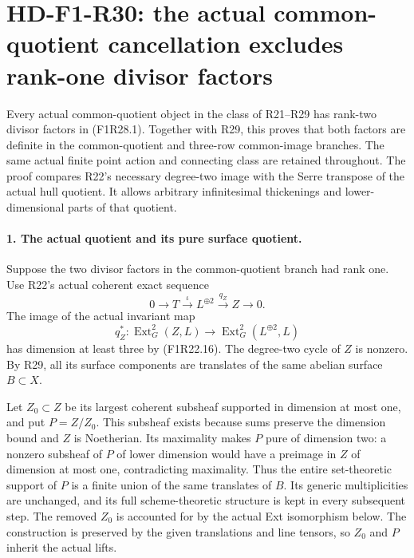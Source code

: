 \section[HD-F1-R30: parallel surface defects cannot cancel]{HD-F1-R30: the actual common-quotient cancellation excludes rank-one divisor factors}
\label{sec:followup-rm-parallel-surface-cancellation}

Every actual common-quotient object in the class
of R21--R29 has rank-two divisor factors in
(F1R28.1). Together with R29, this proves that
both factors are definite in the common-quotient
and three-row common-image branches.
The same actual finite point action and
connecting class are retained throughout.
The proof compares R22's necessary
degree-two image with the Serre transpose of
the actual hull quotient. It allows arbitrary
infinitesimal thickenings and lower-dimensional
parts of that quotient.

\paragraph{1. The actual quotient and its pure surface quotient.}
Suppose the two divisor factors in the
common-quotient branch had rank one.
Use R22's actual coherent exact sequence
\[
       0\longrightarrow T
          \xrightarrow{\iota}L^{\oplus2}
          \xrightarrow{q_Z}Z\longrightarrow0.
 \tag{F1R30.1}
\]
The image of the actual invariant map
\[
 q_Z^*:\operatorname{Ext}^2_G(Z,L)
                \longrightarrow
                    \operatorname{Ext}^2_G(L^{\oplus2},L)
 \tag{F1R30.2}
\]
has dimension at least three by (F1R22.16).
The degree-two cycle of $Z$ is nonzero.
By R29, all its surface components are
translates of the same abelian surface
$B\subset X$.

Let $Z_0\subset Z$ be its largest coherent
subsheaf supported in dimension at most one,
and put $P=Z/Z_0$. This subsheaf exists
because sums preserve the dimension bound
and $Z$ is Noetherian. Its maximality
makes $P$ pure of dimension two: a
nonzero subsheaf of $P$ of lower dimension
would have a preimage in $Z$ of dimension
at most one, contradicting maximality.
Thus the entire set-theoretic support of
$P$ is a finite union of the same
translates of $B$. Its generic multiplicities
are unchanged, and its full scheme-theoretic
structure is kept in every subsequent step.
The removed $Z_0$ is accounted for by the
actual Ext isomorphism below.
The construction is preserved by the
given translations and line tensors,
so $Z_0$ and $P$ inherit the actual lifts.

